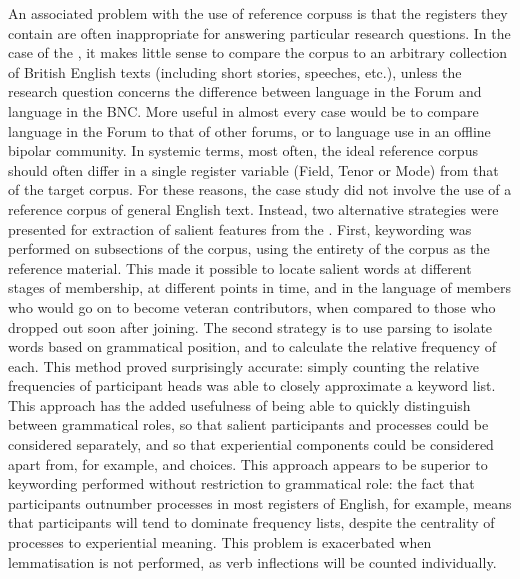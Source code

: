 An associated problem with the use of reference \glspl{corpus} is that the registers they contain are often inappropriate for answering particular research questions. In the case of the , it makes little sense to compare the corpus to an arbitrary collection of British English texts (including short stories, speeches, etc.), unless the research question concerns the difference between language in the \gls{Forum} and language in the BNC. More useful in almost every case would be to compare language in the \gls{Forum} to that of other \glspl{forum}, or to language use in an offline \gls{bipolar} community. In systemic terms, most often, the ideal reference \gls{corpus} should often differ in a single register variable (Field, Tenor or Mode) from that of the target \gls{corpus}. For these reasons, the case study did not involve the use of a reference \gls{corpus} of general English text. Instead, two alternative strategies were presented for extraction of salient  features from the . First, keywording was performed on subsections of the \gls{corpus}, using the entirety of the \gls{corpus} as the reference material. This made it possible to locate salient words at different stages of membership, at different points in time, and in the language of members who would go on to become veteran contributors, when compared to those who dropped out soon after joining. The second strategy is to use parsing to isolate words based on grammatical position, and to calculate the relative frequency of each. This method proved surprisingly accurate: simply counting the relative frequencies of participant heads was able to closely approximate a keyword list. This approach has the added usefulness of being able to quickly distinguish between grammatical roles, so that salient participants and processes could be considered separately, and so that experiential components could be considered apart from, for example,  and  choices. This approach appears to be superior to keywording performed without restriction to grammatical role: the fact that participants outnumber processes in most registers of English, for example, means that participants will tend to dominate frequency lists, despite the centrality of processes to experiential meaning. This problem is exacerbated when lemmatisation is not performed, as verb inflections will be counted individually.

